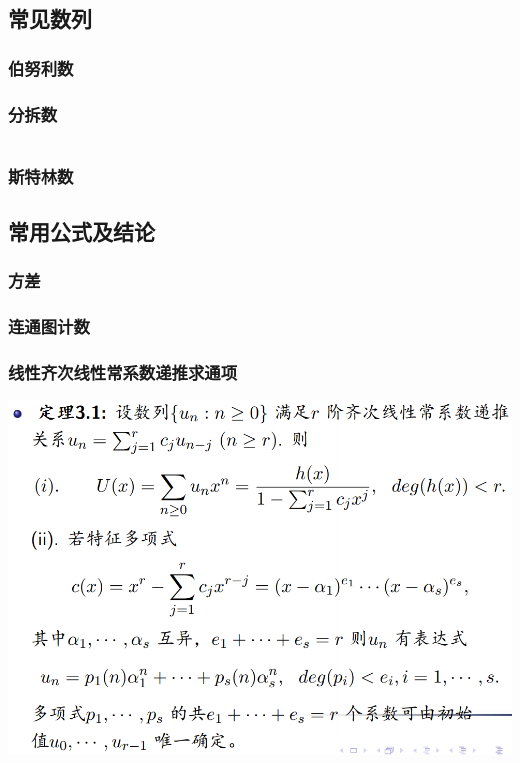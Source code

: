 \documentclass[a4paper]{article}
\begin{document}
\begin{multicols}{2}
			\subsection{常见数列}
				\subsubsection{伯努利数}
					
				
				\subsubsection{分拆数}
					\inputminted{cpp}{../src/math/分拆数.cpp}
				
				\subsubsection{斯特林数}
					
			
			\subsection{常用公式及结论}
				\subsubsection{方差}
					
				
				\subsubsection{连通图计数}
					

				\subsubsection{线性齐次线性常系数递推求通项}
					\includegraphics[scale = 0.27]{../src/math/线性齐次线性常系数递推.png}



\end{multicols}
\end{document}
